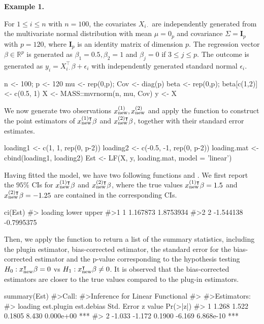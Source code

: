\noindent\textbf{Example 1.} {For $1\leq i\leq n$ with $n = 100$, the covariates $X_{i\cdot}$ are independently generated from the multivariate normal distribution with mean $\mu = 0_p$ and covariance $\Sigma = \mathbf{I}_p$ with $p = 120$, where $\mathbf{I}_p$ is an identity matrix of dimension $p$. The regression vector $\beta \in \mathbb{R}^p$ is generated as $\beta_1 = 0.5, \beta_2 = 1$ and $\beta_j = 0$ if $3 \leq j \leq p$. The outcome is generated as $y_i = X_{i\cdot}^\intercal \beta + \epsilon_i$ with independently generated standard normal {$\epsilon_i$}.
\begin{example}
    n <- 100; p <- 120
    mu <- rep(0,p); Cov <- diag(p)
    beta <- rep(0,p); beta[c(1,2)] <- c(0.5, 1)
    X <- MASS::mvrnorm(n, mu, Cov)
    y <- X %
\end{example}

\noindent We now generate two observations $x_{\rm new}^{(1)}, x_{\rm new}^{(2)}$ and apply the  function to construct the point estimators of $x_{\rm new}^{(1)\intercal}\beta$ and $x_{\rm new}^{(2)\intercal}\beta$, together with their standard error estimates. 
\begin{example}
    loading1 <- c(1, 1, rep(0, p-2))
    loading2 <- c(-0.5, -1, rep(0, p-2))
    loading.mat <- cbind(loading1, loading2)
    Est <- LF(X, y, loading.mat, model = 'linear')
\end{example}
}
\noindent Having fitted the model, we have two following functions  and . We first report the $95\%$ CIs for $x_{\rm new}^{(1)\intercal}\beta$ and $x_{\rm new}^{(2)\intercal}\beta$, where the true values $x_{\rm new}^{(1)\intercal}\beta = 1.5$ and $x_{\rm new}^{(2)\intercal}\beta = -1.25$ are contained in the corresponding CIs.
\begin{example}
    ci(Est)
    #>  loading     lower      upper
    #>1       1  1.167873  1.8753934
    #>2       2 -1.544138 -0.7995375
\end{example}
{Then, we apply the  function to return a list of the summary statistics, including the plugin estimator, bias-corrected estimator, the standard error for the bias-corrected estimator and the p-value corresponding to the hypothesis testing $H_0 : x_{\rm new}^{\intercal}\beta = 0$ vs $H_1 : x_{\rm new}^{\intercal}\beta \neq 0$. It is observed that the bias-corrected estimators are closer to the true values compared to the plug-in estimators. 
\begin{example}
    summary(Est)
    #>Call: 
    #>Inference for Linear Functional
    #>
    #>Estimators: 
    #> loading est.plugin est.debias Std. Error z value  Pr(>|z|)   
    #>       1      1.268      1.522     0.1805   8.430 0.000e+00 ***
    #>       2     -1.033     -1.172     0.1900  -6.169 6.868e-10 ***
\end{example}
} 
